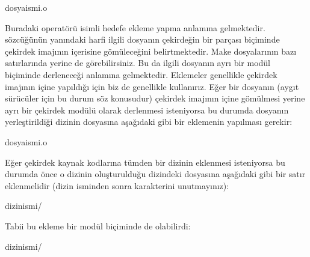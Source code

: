 \documentclass[a4paper,10pt,turkish]{sphinxmanual}
\begin{document}
\begin{sphinxVerbatim}[commandchars=\\\{\}]
dosya\PYGZus{}ismi.o
\end{sphinxVerbatim}

\sphinxAtStartPar
Buradaki \sphinxcode{\sphinxupquote{+=}} operatörü  isimli hedefe ekleme yapma anlamına gelmektedir.  sözcüğünün
yanındaki  harfi ilgili dosyanın çekirdeğin bir parçası biçiminde çekirdek imajının içerisine
gömüleceğini belirtmektedir. Make dosyalarının bazı satırlarında  yerine  de görebilirsiniz.
Bu da ilgili dosyanın ayrı bir modül biçiminde derleneceği anlamına gelmektedir. Eklemeler genellikle
çekirdek imajının içine yapıldığı için biz de genellikle  kullanırız. Eğer bir dosyanın (aygıt
sürücüler için bu durum söz konusudur) çekirdek imajının içine gömülmesi yerine ayrı bir çekirdek modülü
olarak derlenmesi isteniyorsa bu durumda dosyanın yerleştirildiği dizinin  dosyasına aşağıdaki
gibi bir eklemenin yapılması gerekir:

\begin{sphinxVerbatim}[commandchars=\\\{\}]
dosya\PYGZus{}ismi.o
\end{sphinxVerbatim}

\sphinxAtStartPar
Eğer çekirdek kaynak kodlarına tümden bir dizinin eklenmesi isteniyorsa bu durumda önce o dizinin
oluşturulduğu dizindeki  dosyasına aşağıdaki gibi bir satır eklenmelidir (dizin isminden
sonra \sphinxcode{\sphinxupquote{/}} karakterini unutmayınız):

\begin{sphinxVerbatim}[commandchars=\\\{\}]
dizin\PYGZus{}ismi/
\end{sphinxVerbatim}

\sphinxAtStartPar
Tabii bu ekleme bir modül biçiminde de olabilirdi:

\begin{sphinxVerbatim}[commandchars=\\\{\}]
dizin\PYGZus{}ismi/
\end{sphinxVerbatim}
\end{document}
